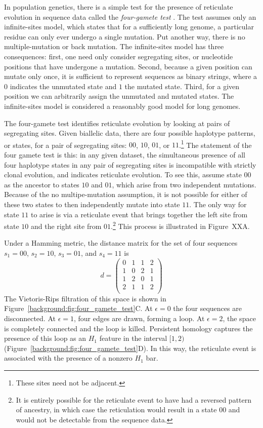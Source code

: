 In population genetics, there is a simple test for the presence of reticulate evolution in sequence data called the \emph{four-gamete test} \cite{Hudson:1985}.
The test assumes only an infinite-sites model, which states that for a sufficiently long genome, a particular residue can only ever undergo a single mutation.
Put another way, there is no multiple-mutation or back mutation.
The infinite-sites model has three consequences: first, one need only consider segregating sites, or nucleotide positions that have undergone a mutation.
Second, because a given position can mutate only once, it is sufficient to represent sequences as binary strings, where a $0$ indicates the unmutated state and $1$ the mutated state.
Third, for a given position we can arbitrarily assign the unmutated and mutated states.
The infinite-sites model is considered a reasonably good model for long genomes.

The four-gamete test identifies reticulate evolution by looking at pairs of segregating sites.
Given biallelic data, there are four possible haplotype patterns, or states, for a pair of segregating sites: $00$, $10$, $01$, or $11$.\footnote{These sites need not be adjacent.}
The statement of the four gamete test is this: in any given dataset, the simultaneous presence of all four haplotype states in any pair of segregating sites is incompatible with strictly clonal evolution, and indicates reticulate evolution.
To see this, assume state $00$ as the ancestor to states $10$ and $01$, which arise from two independent mutations.
Because of the no multipe-mutation assumption, it is not possible for either of these two states to then independently mutate into state $11$.
The only way for state $11$ to arise is via a reticulate event that brings together the left site from state $10$ and the right site from $01$.\footnote{It is entirely possible for the reticulate event to have had a reversed pattern of ancestry, in which case the reticulation would result in a state $00$ and would not be detectable from the sequence data.}
This process is illustrated in Figure~XXA.

Under a Hamming metric, the distance matrix for the set of four sequences $s_1=00$, $s_2=10$, $s_3=01$, and $s_4=11$ is
\begin{equation}
d = 
\begin{pmatrix}
0 & 1 & 1 & 2 \\
1 & 0 & 2 & 1 \\
1 & 2 & 0 & 1 \\
2 & 1 & 1 & 2 \\
\end{pmatrix}
\end{equation}
The Vietoris-Rips filtration of this space is shown in Figure~\ref{background:fig:four_gamete_test}C.
At $\epsilon=0$ the four sequences are disconnected.
At $\epsilon=1$, four edges are drawn, forming a loop.
At $\epsilon=2$, the space is completely connected and the loop is killed.
Persistent homology captures the presence of this loop as an $H_1$ feature in the interval $[1,2)$ (Figure~\ref{background:fig:four_gamete_test}D).
In this way, the reticulate event is associated with the presence of a nonzero $H_1$ bar.

